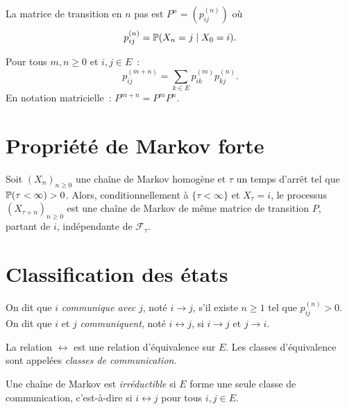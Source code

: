 \begin{definition}
La matrice de transition en $n$ pas est $P^n = (p_{ij}^{(n)})$ o\`u
\[
  p_{ij}^{(n)} = \mathbb{P}(X_n = j \mid X_0 = i).
\]
\end{definition}

\begin{theoreme}
Pour tous $m, n \geq 0$ et $i, j \in E$~:
\[
  p_{ij}^{(m+n)} = \sum_{k \in E} p_{ik}^{(m)} p_{kj}^{(n)}.
\]
En notation matricielle~: $P^{m+n} = P^m P^n$.
\end{theoreme}

\section{Propri\'et\'e de Markov forte}

\begin{theoreme}
\label{thm:markov_forte}
Soit $(X_n)_{n \geq 0}$ une cha\^ine de Markov homog\`ene et $\tau$ un temps
d'arr\^et tel que $\mathbb{P}(\tau < \infty) > 0$. Alors, conditionnellement \`a
$\{\tau < \infty\}$ et $X_{\tau} = i$, le processus $(X_{\tau + n})_{n \geq 0}$
est une cha\^ine de Markov de m\^eme matrice de transition $P$, partant de $i$,
ind\'ependante de $\mathcal{F}_{\tau}$.
\end{theoreme}

\section{Classification des \'etats}

\begin{definition}[Communication]
On dit que $i$ \emph{communique avec} $j$, not\'e $i \to j$, s'il existe $n \geq 1$
tel que $p_{ij}^{(n)} > 0$. On dit que $i$ et $j$ \emph{communiquent}, not\'e
$i \leftrightarrow j$, si $i \to j$ et $j \to i$.
\end{definition}

\begin{proposition}
La relation $\leftrightarrow$ est une relation d'\'equivalence sur $E$. Les
classes d'\'equivalence sont appel\'ees \emph{classes de communication}.
\end{proposition}

\begin{definition}
Une cha\^ine de Markov est \emph{irr\'eductible} si $E$ forme une seule classe
de communication, c'est-\`a-dire si $i \leftrightarrow j$ pour tous $i, j \in E$.
\end{definition}

